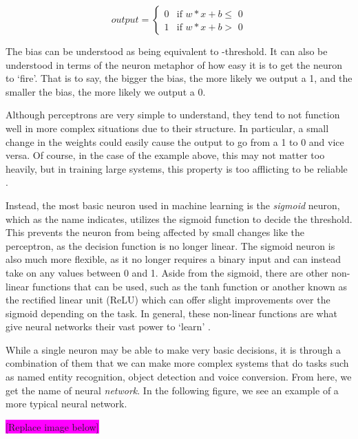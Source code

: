 \documentclass
[
    a4paper,
    twoside,
    12pt,
]
{report}
\begin{document}
\begin{equation*}
    output=\begin{cases}
        0 & \text{if $w * x + b \leq$ 0} \\
        1 & \text{if $w * x + b >$ 0}
    \end{cases}
\end{equation*}

The bias can be understood as being equivalent to -threshold. It can
also be understood in terms of the neuron metaphor of how easy it is to
get the neuron to `fire'. That is to say, the bigger the bias, the more
likely we output a 1, and the smaller the bias, the more likely we
output a 0.

Although perceptrons are very simple to understand, they tend to not
function well in more complex situations due to their structure. In
particular, a small change in the weights could easily cause the output
to go from a 1 to 0 and vice versa. Of course, in the case of the
example above, this may not matter too heavily, but in training large
systems, this property is too afflicting to be reliable
\parencite{nielsen2015}.

Instead, the most basic neuron used in machine learning is the
\emph{sigmoid} neuron, which as the name indicates, utilizes the sigmoid
function to decide the threshold. This prevents the neuron from being
affected by small changes like the perceptron, as the decision function
is no longer linear. The sigmoid neuron is also much more flexible, as
it no longer requires a binary input and can instead take on any values
between 0 and 1. Aside from the sigmoid, there are other non-linear
functions that can be used, such as the tanh function or another known
as the rectified linear unit (ReLU) which can offer slight improvements
over the sigmoid depending on the task. In general, these non-linear
functions are what give neural networks their vast power to `learn'
\parencite{nielsen2015}.

While a single neuron may be able to make very basic decisions, it is
through a combination of them that we can make more complex systems that
do tasks such as named entity recognition, object detection and voice
conversion. From here, we get the name of neural \emph{network}. In the
following figure, we see an example of a more typical neural network.

\colorbox{magenta}{[Replace image below]}
\end{document}
